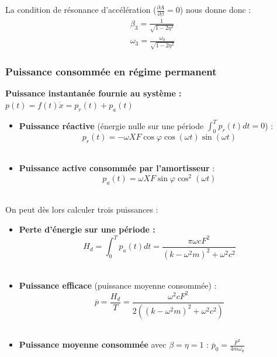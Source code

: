 \documentclass[../main.tex]{subfiles}
\begin{document}
La condition de résonance d'accélération ($\frac{\partial A}{\partial \beta} = 0$) nous donne donc : \begin{equation}
    \begin{gathered}
        \beta_3 = \frac{1}{\sqrt{1-2\eta^2}}\\
        \omega_3 = \frac{\omega_0}{\sqrt{1-2\eta^2}}
    \end{gathered}
\end{equation}

\subsubsection{Puissance consommée en régime permanent}
\textbf{Puissance instantanée fournie au système :} $p(t) = f(t) \dot{x} = p_r(t)+p_a(t)$\\

\begin{itemize}
    \item \textbf{Puissance réactive} (énergie nulle sur une période $\int_0^T p_r(t)dt = 0$) : \begin{equation}
        p_r(t) = -\omega XF \cos{\varphi} \cos{(\omega t)} \sin{(\omega t)}
    \end{equation}\\
    \item \textbf{Puissance active consommée par l'amortisseur} : \begin{equation}
        p_a(t) = \omega X F \sin{\varphi} \cos^2(\omega t)
    \end{equation}\\
\end{itemize}

On peut dès lors calculer trois puissances : \begin{itemize}
    \item \textbf{Perte d'énergie sur une période :} \begin{equation}
    H_d = \int_0^T p_a(t)dt = \frac{\pi \omega c F^2}{(k-\omega^2m)^2 + \omega^2c^2}
\end{equation}\\
    \item \textbf{Puissance efficace} (puissance moyenne consommée) : \begin{equation}
        \overline{p} = \frac{H_d}{T} = \frac{\omega^2 c F^2}{2((k-\omega^2m)^2+\omega^2c^2)}
    \end{equation}\\
    \item \textbf{Puissance moyenne consommée} avec $\beta = \eta = 1$ : $\overline{p}_0 = \frac{F^2}{4m \omega_0}$\\
\end{itemize}
\end{document}
